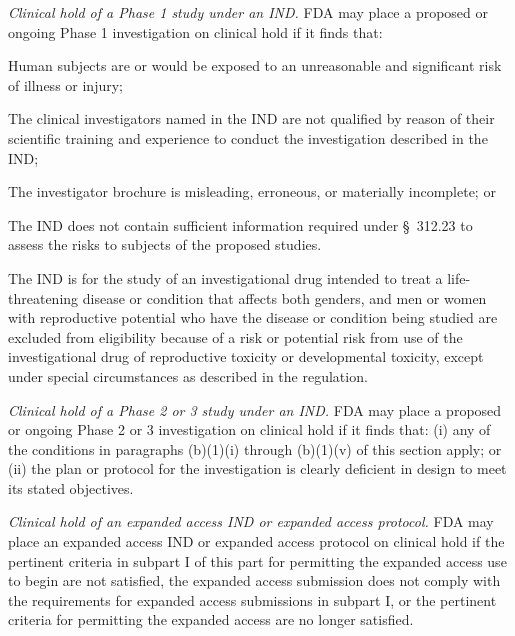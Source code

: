 \documentclass[11pt]{article}
\begin{document}
\begin{description}[leftmargin=0.5cm,style=sameline]
\item[(1)] \textit{Clinical hold of a Phase 1 study under an IND.} FDA may place a proposed or ongoing Phase 1 investigation on clinical hold if it finds that:
\begin{description}[leftmargin=0.8cm,style=sameline]
\item[(i)] Human subjects are or would be exposed to an unreasonable and significant risk of illness or injury;
\item[(ii)] The clinical investigators named in the IND are not qualified by reason of their scientific training and experience to conduct the investigation described in the IND;
\item[(iii)] The investigator brochure is misleading, erroneous, or materially incomplete; or
\item[(iv)] The IND does not contain sufficient information required under \S~312.23 to assess the risks to subjects of the proposed studies.
\item[(v)] The IND is for the study of an investigational drug intended to treat a life-threatening disease or condition that affects both genders, and men or women with reproductive potential who have the disease or condition being studied are excluded from eligibility because of a risk or potential risk from use of the investigational drug of reproductive toxicity or developmental toxicity, except under special circumstances as described in the regulation.
\end{description}

\item[(2)] \textit{Clinical hold of a Phase 2 or 3 study under an IND.} FDA may place a proposed or ongoing Phase 2 or 3 investigation on clinical hold if it finds that: (i) any of the conditions in paragraphs (b)(1)(i) through (b)(1)(v) of this section apply; or (ii) the plan or protocol for the investigation is clearly deficient in design to meet its stated objectives.

\item[(3)] \textit{Clinical hold of an expanded access IND or expanded access protocol.} FDA may place an expanded access IND or expanded access protocol on clinical hold if the pertinent criteria in subpart I of this part for permitting the expanded access use to begin are not satisfied, the expanded access submission does not comply with the requirements for expanded access submissions in subpart I, or the pertinent criteria for permitting the expanded access are no longer satisfied.


\end{description}
\end{document}

